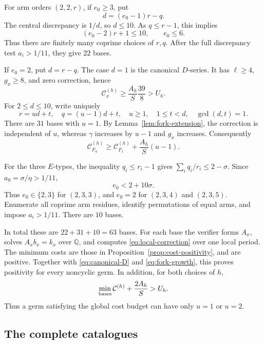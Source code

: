 \documentclass[12pt,a4paper]{article}
\numberwithin{equation}{section}
\theoremstyle{definition}
\newcommand{\Q}{\mathbb Q}
\newcommand{\cost}{\mathcal C}
\begin{document}
For arm orders \((2,2,r)\), if \(e_0\geq3\), put
\[
                         d=(e_0-1)r-q.
\]
The central discrepancy is \(1/d\), so \(d\leq10\).
As \(q\leq r-1\), this implies
\[
                    (e_0-2)r+1\leq10,\qquad e_0\leq6.
\]
Thus there are finitely many coprime choices of \(r,q\).
After the full discrepancy test \(a_i>1/11\), they give \(22\)
bases.

If \(e_0=2\), put \(d=r-q\).
The case \(d=1\) is the canonical \(D\)-series. It has \(\ell\geq4\),
\(g_x\geq8\), and zero correction, hence
\begin{equation}\label{eq:canonical-D}
            \cost_x^{(h)}\geq\frac{A_h}{S}\frac{39}{8}>U_h.
\end{equation}
For \(2\leq d\leq10\), write uniquely
\[
 r=ud+t,\quad q=(u-1)d+t,\quad u\geq1,\quad
 1\leq t<d,\quad \gcd(d,t)=1.
\]
There are \(31\) bases with \(u=1\). By
Lemma~\ref{lem:fork-extension}, the correction is independent of \(u\),
whereas \(\gamma\) increases by \(u-1\) and \(g_x\) increases.
Consequently
\begin{equation}\label{eq:fork-growth}
                  \cost_{F_u}^{(h)}
       \geq\cost_{F_1}^{(h)}+\frac{A_h}{S}(u-1).
\end{equation}

For the three \(E\)-types, the inequality \(q_i\leq r_i-1\)
gives \(\sum_iq_i/r_i\leq2-\sigma\).
Since \(a_0=\sigma/\eta>1/11\),
\[
                           e_0<2+10\sigma.
\]
Thus \(e_0\in\{2,3\}\) for \((2,3,3)\), and \(e_0=2\) for
\((2,3,4)\) and \((2,3,5)\).
Enumerate all coprime arm residues, identify permutations of equal
arms, and impose \(a_i>1/11\). There are \(10\) bases.

In total these are \(22+31+10=63\) bases.
For each base the verifier forms \(A_x\), solves \(A_xb_x=k_x\)
over \(\Q\), and computes
\eqref{eq:local-correction} over one local period.
The minimum costs are those in
Proposition~\ref{prop:cost-positivity}, and are positive.
Together with \eqref{eq:canonical-D} and \eqref{eq:fork-growth},
this proves positivity for every noncyclic germ.
In addition, for both choices of \(h\),
\begin{equation}\label{eq:fork-cutoff}
            \min_{\rm bases}\cost^{(h)}+\frac{2A_h}{S}>U_h.
\end{equation}
Thus a germ satisfying the global cost budget can have only
\(u=1\) or \(u=2\).

\subsection{The complete catalogues}
\end{document}
